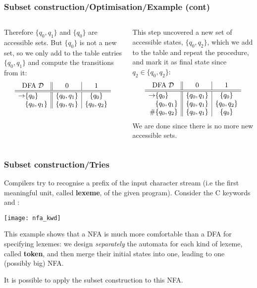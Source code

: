 % 
\begin{frame}
\frametitle{Subset construction/Optimisation/Example (cont)}

\begin{columns}

   Therefore \(\{q_0,q_1\}\) and \(\{q_0\}\) are
  accessible sets. But \(\{q_0\}\) is not a new set, so we only add to
  the table entries \(\{q_0, q_1\}\) and compute the transitions from
  it:
  \[
  \begin{array}{r@{}l||c|c}
    \multicolumn{2}{c||}{\text{DFA} \; {\cal D}} & 0 & 1\\
    \hline\hline
    \rightarrow & \{q_0\}      & \{q_0, q_1\} & \{q_0\}\\
                & \{q_0, q_1\} & \{q_0, q_1\} & \{q_0, q_2\}
  \end{array}
  \]

   This step uncovered a new set of accessible
  states, \(\{q_0, q_2\}\), which we add to the table and repeat the
  procedure, and mark it as final state since \(q_2 \in \{q_0,
  q_2\}\):
  \[
  \begin{array}{r@{}l||c|c}
    \multicolumn{2}{c||}{\text{DFA} \; {\cal D}} & 0 & 1\\
    \hline\hline
    \rightarrow & \{q_0\}      & \{q_0, q_1\} & \{q_0\}\\
                & \{q_0, q_1\} & \{q_0, q_1\} & \{q_0, q_2\}\\
             \# & \{q_0, q_2\} & \{q_0, q_1\} & \{q_0\}
  \end{array}
  \]
  We are done since there is no more new accessible sets.

\end{columns}

\end{frame}


% 
\begin{frame}
\frametitle{Subset construction/Tries}

Compilers try to recognise a prefix of the input character stream (i.e
the first meaningful unit, called \textbf{lexeme}, of the given
program). Consider the C keywords  and :
\begin{center}
\texttt{[image: nfa\_kwd]}
\end{center}
This example shows that a NFA is much more comfortable than a DFA for
specifying lexemes: we design \emph{separately}
the automata for each kind of lexeme, called \textbf{token}, and then
merge their initial states into one, leading to one (possibly big)
NFA.

\bigskip

It is possible to apply the subset construction to this NFA.

\end{frame}

